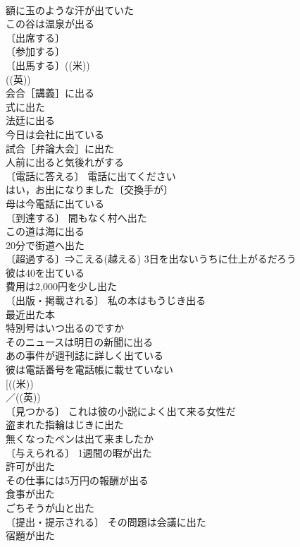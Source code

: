 \documentclass[8pt]{extreport}
\begin{document}
\begin{CJK}{UTF8}{min}
\\	額に玉のような汗が出ていた 
\\	この谷は温泉が出る 
\\	〔出席する〕
\\	〔参加する〕
\\	〔出馬する〕((米)) 
\\	((英)) 
\\	会合［講義］に出る 
\\	式に出た 
\\	法廷に出る 
\\	今日は会社に出ている 
\\	試合［弁論大会］に出た 
\\	人前に出ると気後れがする 
\\	〔電話に答える〕 電話に出てください 
\\	はい，お出になりました〔交換手が〕 
\\	母は今電話に出ている 
\\	〔到達する〕 間もなく村へ出た 
\\	この道は海に出る 
\\	20分で街道へ出た 
\\	〔超過する〕⇒こえる(越える) 3日を出ないうちに仕上がるだろう 
\\	彼は40を出ている 
\\	費用は2,000円を少し出た 
\\	〔出版・掲載される〕 私の本はもうじき出る 
\\	最近出た本 
\\	特別号はいつ出るのですか 
\\	そのニュースは明日の新聞に出る 
\\	あの事件が週刊誌に詳しく出ている 
\\	彼は電話番号を電話帳に載せていない 
\\	[((米)) 
\\	／((英)) 
\\	〔見つかる〕 これは彼の小説によく出て来る女性だ 
\\	盗まれた指輪はじきに出た 
\\	無くなったペンは出て来ましたか 
\\	〔与えられる〕 1週間の暇が出た 
\\	許可が出た 
\\	その仕事には5万円の報酬が出る 
\\	食事が出た 
\\	ごちそうが山と出た 
\\	〔提出・提示される〕 その問題は会議に出た 
\\	宿題が出た 

\end{CJK}
\end{document}
